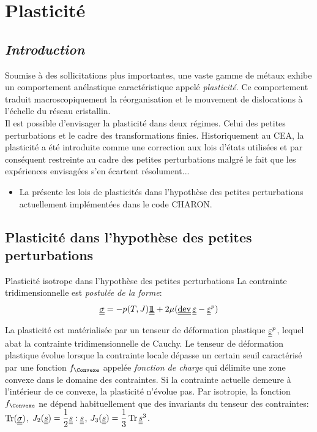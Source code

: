 \documentclass[10pt]{book}
\begin{document}
\newcommand{\TenVMAnis}{\PP}
\newcommand{\DeltaSC}{\ten{\Delta}\SC}
\newcommand{\DeltaDefoHPP}{\ten{\Delta}\DefoHPP}
\newcommand{\DeltaEpsP}{\DeltaDefoHPP^{p}}
\newcommand{\ConvElas}{C}
\newcommand{\TenNormale}{\ten{N}}
\newcommand{\CentreConv}{\ten{X}}
\newcommand{\HatSigRel}{\hat{\ten{\psi}}_{Rel}}
\newcommand{\ChalMassUn}{q_{exp}^{m\, (1)}}
\chapter{Plasticité}\label{Chapitre:Plasticité}
\section*{\emph{Introduction}}
Soumise à des sollicitations plus importantes, une vaste gamme de métaux exhibe un comportement anélastique caractéristique appelé \emph{plasticité}. Ce comportement traduit macroscopiquement la réorganisation et le mouvement de dislocations à l'échelle du réseau cristallin.\\

Il est possible d'envisager la plasticité dans deux régimes. Celui des petites perturbations et le cadre des transformations finies. Historiquement au CEA, la plasticité a été introduite comme une correction aux lois d'états utilisées et par conséquent restreinte au cadre des petites perturbations malgré le fait que les expériences envisagées s'en écartent résolument...
\begin{itemize}[label=$\star$]
\item  La  présente les lois de plasticités dans l'hypothèse des petites perturbations actuellement implémentées dans le code CHARON.
\end{itemize}
\section{Plasticité dans l'hypothèse des petites perturbations}\label{Section:Introduction de la plasticité HPP}
\begin{Postulat}{Plasticité isotrope dans l'hypothèse des petites perturbations} La contrainte tridimensionnelle est \emph{postulée de la forme}:
$$\SC=-p(T,\J)\TenUnit+2\mu(\dev\Eps-\EpsP)$$
\end{Postulat}
La plasticité est matérialisée par un tenseur de déformation plastique $\underline{\underline{\varepsilon}}^p$, lequel abat la contrainte tridimensionnelle de Cauchy. Le tenseur de déformation plastique évolue lorsque la contrainte locale dépasse un certain seuil caractérisé par une fonction $\FChargeConvexe$ appelée \emph{fonction de charge} qui délimite une zone convexe dans le domaine des contraintes. Si la contrainte actuelle demeure à l'intérieur de ce convexe, la plasticité n'évolue pas. Par isotropie, la fonction $\FChargeConvexe$ ne dépend habituellement que des invariants du tenseur des contraintes: $\tr(\SC)$, $J_{2}(\underline{\underline{s}}) = \dfrac{1}{2}\underline{\underline{s}}:\underline{\underline{s}}$, $J_{3}(\devia) = \dfrac{1}{3}\tr\devia^{3}$.
\end{document}

